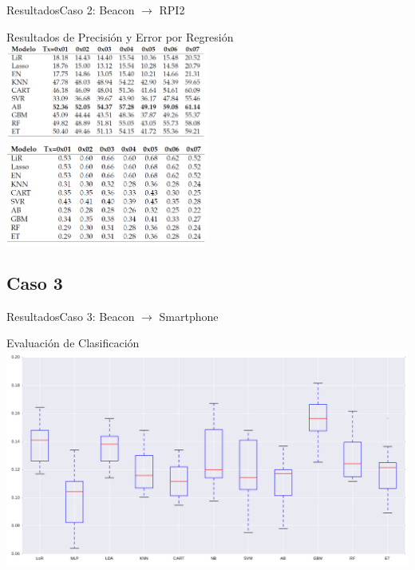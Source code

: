 \documentclass[10pt]{beamer}
\begin{document}
\begin{frame}{Resultados}{Caso 2: Beacon $\rightarrow$ RPI2}
\begin{block}{Resultados de Precisión y Error por Regresión}
\includegraphics[width=0.5\textwidth]{AAUgraphics/raspRegresion}
\includegraphics[width=0.5\textwidth]{AAUgraphics/raspRegresionErr}
\end{block}
\end{frame}
\subsection{Caso 3}
\begin{frame}{Resultados}{Caso 3: Beacon $\rightarrow$ Smartphone}
\begin{block}{Evaluación de Clasificación}
\includegraphics[width=1.0\textwidth]{AAUgraphics/movTx07Class}
\end{block}
\end{frame}
\end{document}
